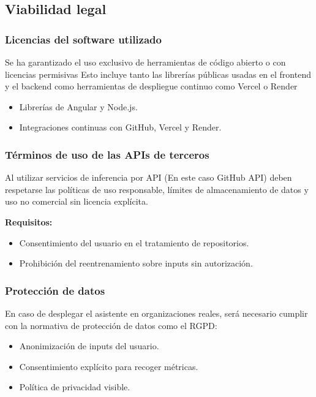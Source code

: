 \subsection{Viabilidad legal}

\subsubsection{Licencias del software utilizado}

Se ha garantizado el uso exclusivo de herramientas de código abierto o con licencias permisivas  Esto incluye tanto las librerías públicas usadas en el frontend y el backend como herramientas de despliegue continuo como Vercel o Render

\begin{itemize}
	\item Librerías de Angular y Node.js.
	\item Integraciones continuas con GitHub, Vercel y Render.
\end{itemize}

\subsubsection{Términos de uso de las APIs de terceros}

Al utilizar servicios de inferencia por API (En este caso GitHub API) deben respetarse las políticas de uso responsable, límites de almacenamiento de datos y uso no comercial sin licencia explícita.

\textbf{Requisitos:}

\begin{itemize}
	\item Consentimiento del usuario en el tratamiento de repositorios.
	\item Prohibición del reentrenamiento sobre inputs sin autorización.
\end{itemize}

\subsubsection{Protección de datos}

En caso de desplegar el asistente en organizaciones reales, será necesario cumplir con la normativa de protección de datos como el RGPD:

\begin{itemize}
	\item Anonimización de inputs del usuario.
	\item Consentimiento explícito para recoger métricas.
	\item Política de privacidad visible.
\end{itemize}

